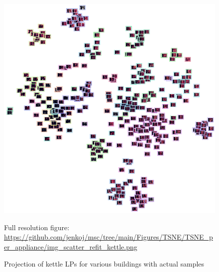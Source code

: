\begin{figure}[H]
	\centering
	\caption{Projection of kettle LPs for various buildings with actual samples}
	\includegraphics[width=.9\textwidth]{Figures/TSNE/TSNE_per_appliance/img_scatter_refit_kettle.png}
	\label{fig:tsne_pa_img_scatter_all_kettle}
	\par
	\par\footnotesize{Full resolution figure: \url{https://github.com/jenkoj/msc/tree/main/Figures/TSNE/TSNE_per_appliance/img_scatter_refit_kettle.png}}
\end{figure}



